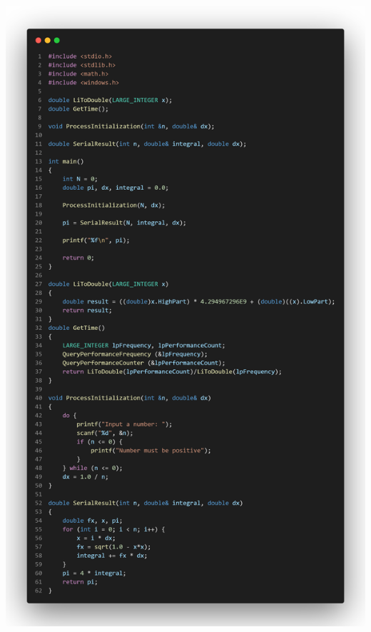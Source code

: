 \documentclass[12pt,a4paper]{report}
\begin{document}
\begin{center}
	\includegraphics[trim=0in 0in 0in 24.5in, clip, scale=0.25]{./Photos/PI/serial.PNG}
\end{center}
\end{document}
